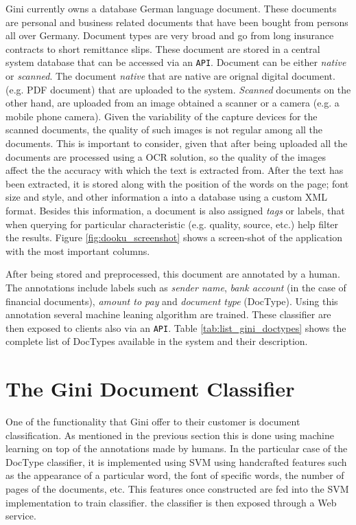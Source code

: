 Gini currently owns a database  German language document. These documents 
are personal and business related documents that have been bought 
from  persons all over Germany. Document types are very broad and go from
long insurance contracts to short remittance slips. These document are stored
in a central system database that can be accessed via an  \texttt{API}.
Document can be either \textit{native} or \textit{scanned}. The document
\textit{native} that are native are orignal digital document. (e.g. PDF document) that
are uploaded to the system. \textit{Scanned} documents on the other hand, are
uploaded from an image obtained a scanner or a camera (e.g. a mobile phone
camera). Given the variability of the capture devices for the scanned
documents, the quality of such images is not regular among all the documents.
This is important to consider, given that after being uploaded all the
documents are processed using a \ac{OCR} solution, so the quality of the
images affect the the accuracy with which the text is extracted from. 
After the text has been extracted, it is stored  along with
the position of the words on the page; font size and style,  and other information a into a database using a custom
\textsc{XML} format.  Besides this information, a document is also assigned
\textit{tags} or labels, that when querying for particular characteristic
(e.g. quality, source, etc.) help filter the results. Figure
\ref{fig:dooku_screenshot} shows a screen-shot of the application with the
most important columns.


After being stored and preprocessed, this document are annotated by a human.
The annotations include labels such as  \textit{sender name}, \textit{bank
  account} (in the case of financial documents), \textit{amount to pay} and
\textit{document type} (\ac{DocType}). Using this annotation several
machine leaning algorithm are trained.  These classifier are then exposed to
clients also via an \texttt{API}. Table \ref{tab:list_gini_doctypes} shows the
complete list of \ac{DocTypes} available in the system and their description.


\section{The Gini Document Classifier}  
\label{sec:gini_doctype_classifier}

One of the functionality that Gini offer to their customer is document
classification.  As mentioned in the previous section this is done using
machine learning on top of the annotations made by humans. In the particular
case of the \ac{DocType} classifier, it is implemented using \ac{SVM} using
handcrafted features such as the appearance of a particular word, the font
of specific words, the number of pages of the documents, etc. This features
once constructed are fed into the \ac{SVM} implementation to train classifier. the
classifier is then exposed through a Web service.

